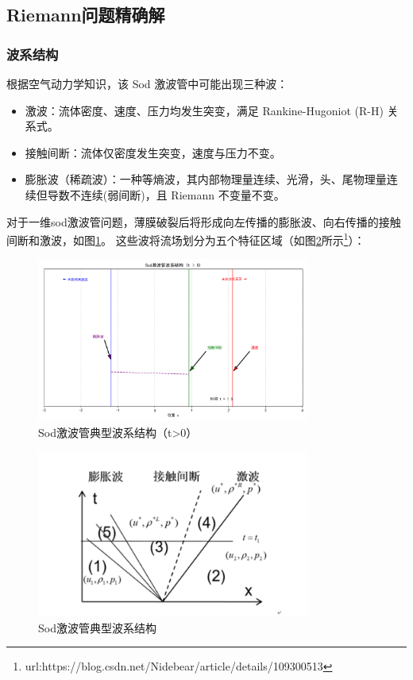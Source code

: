 \documentclass[UTF8]{ctexart}
\begin{document}
\subsection{Riemann问题精确解}
\subsubsection{波系结构}
根据空气动力学知识，该 Sod 激波管中可能出现三种波：
\begin{itemize}
    \item 激波：流体密度、速度、压力均发生突变，满足 Rankine-Hugoniot (R-H) 关系式。
    \item 接触间断：流体仅密度发生突变，速度与压力不变。
    \item 膨胀波（稀疏波）：一种等熵波，其内部物理量连续、光滑，头、尾物理量连续但导数不连续(弱间断)，且 Riemann 不变量不变。
\end{itemize}
对于一维sod激波管问题，薄膜破裂后将形成向左传播的膨胀波、向右传播的接触间断和激波，如图\ref{fig:wave_structure_1}。
这些波将流场划分为五个特征区域（如图\ref{fig:wave_structure_2}所示\footnote{url:https://blog.csdn.net/Nidebear/article/details/109300513}）：
\begin{figure}[H]
    \centering
    \includegraphics[width=0.8\textwidth]{wave_structure_1.png}
    \caption{Sod激波管典型波系结构（t>0）}
    \label{fig:wave_structure_1}
\end{figure}
\begin{figure}[H]
    \centering
    \includegraphics[width=0.8\textwidth]{wave_structure_2.png}
    \caption{Sod激波管典型波系结构}
    \label{fig:wave_structure_2}
\end{figure}
\end{document}
